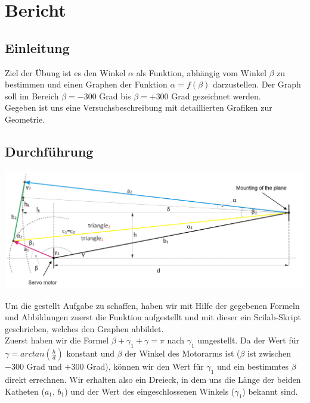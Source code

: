\section{Bericht}

\subsection{Einleitung}
Ziel der Übung ist es den Winkel $\alpha$ als Funktion, abhängig vom Winkel $\beta$ zu bestimmen und einen Graphen der Funktion $\alpha = f(\beta)$ darzustellen. Der Graph soll im Bereich $\beta = -300$ Grad bis $\beta = +300$ Grad gezeichnet werden. \\
Gegeben ist uns eine Versuchsbeschreibung mit detaillierten Grafiken zur Geometrie.

\subsection{Durchführung}
\begin{center}
	\begin{minipage}{\linewidth}
	\centering
	\includegraphics[scale=0.3]{images/figure1.png}
	\end{minipage}
\end{center}
Um die gestellt Aufgabe zu schaffen, haben wir mit Hilfe der gegebenen Formeln und Abbildungen zuerst die Funktion aufgestellt und mit dieser ein Scilab-Skript geschrieben, welches den Graphen abbildet.\\
Zuerst haben wir die Formel $\beta + \gamma_1 + \gamma = \pi$ nach $\gamma_1$ umgestellt. Da der Wert für $\gamma = arctan(\frac{h}{d})$ konstant und $\beta$ der Winkel des Motorarms ist ($\beta$ ist zwischen $-300$ Grad und $+300$ Grad), können wir den Wert für $\gamma_1$ und ein bestimmtes $\beta$ direkt errechnen. Wir erhalten also ein Dreieck, in dem uns die Länge der beiden Katheten ($a_1$, $b_1$) und der Wert des eingeschlossenen Winkels ($\gamma_1$) bekannt sind. \\
